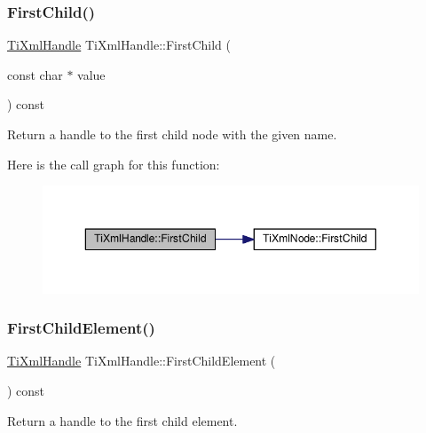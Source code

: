 \subsubsection{\texorpdfstring{First\+Child()}{FirstChild()}\hspace{0.1cm}{\footnotesize\ttfamily [2/2]}}
{\footnotesize\ttfamily \hyperlink{class_ti_xml_handle}{Ti\+Xml\+Handle} Ti\+Xml\+Handle\+::\+First\+Child (\begin{DoxyParamCaption}\item[{const char $\ast$}]{value }\end{DoxyParamCaption}) const}



Return a handle to the first child node with the given name. 

Here is the call graph for this function\+:\nopagebreak
\begin{figure}[H]
\begin{center}
\leavevmode
\includegraphics[width=350pt]{class_ti_xml_handle_a586ebaca4a4d0909db65a765d95d5e59_cgraph}
\end{center}
\end{figure}
\mbox{\label{class_ti_xml_handle_af0643f8683f3f2b779b8c9d78c67b2c0}} 
\subsubsection{\texorpdfstring{First\+Child\+Element()}{FirstChildElement()}\hspace{0.1cm}{\footnotesize\ttfamily [1/2]}}
{\footnotesize\ttfamily \hyperlink{class_ti_xml_handle}{Ti\+Xml\+Handle} Ti\+Xml\+Handle\+::\+First\+Child\+Element (\begin{DoxyParamCaption}{ }\end{DoxyParamCaption}) const}



Return a handle to the first child element. 

